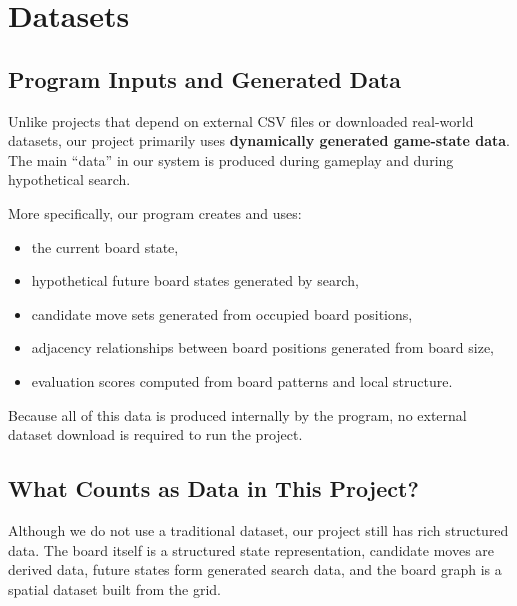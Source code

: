 \documentclass[11pt]{article}
\begin{document}
\section*{Datasets}

\subsection*{Program Inputs and Generated Data}

Unlike projects that depend on external CSV files or downloaded real-world datasets, our project primarily uses \textbf{dynamically generated game-state data}. The main ``data'' in our system is produced during gameplay and during hypothetical search.

More specifically, our program creates and uses:
\begin{itemize}
    \item the current board state,
    \item hypothetical future board states generated by search,
    \item candidate move sets generated from occupied board positions,
    \item adjacency relationships between board positions generated from board size,
    \item evaluation scores computed from board patterns and local structure.
\end{itemize}

Because all of this data is produced internally by the program, no external dataset download is required to run the project.

\subsection*{What Counts as Data in This Project?}

Although we do not use a traditional dataset, our project still has rich structured data. The board itself is a structured state representation, candidate moves are derived data, future states form generated search data, and the board graph is a spatial dataset built from the grid.
\end{document}
